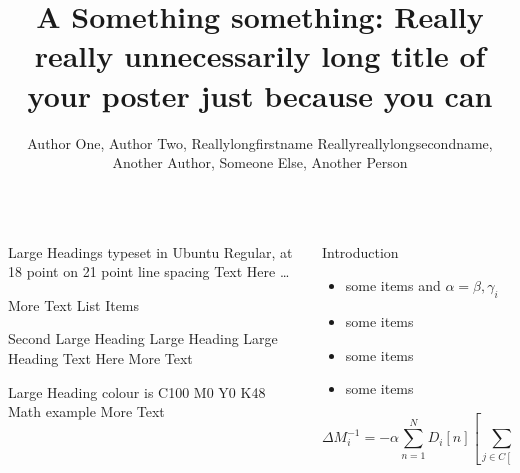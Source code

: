 \documentclass[final,hyperref={pdfpagelabels=false}]{beamer}
\title{A Something something: Really really unnecessarily long title of your poster just because you can}
\author{Author One, Author Two, Reallylongfirstname Reallyreallylongsecondname, \\ Another Author, Someone Else, Another Person}
\begin{document}
\begin{frame}{}
\begin{columns}[T] %
\begin{column}{.43\paperwidth} %

\begin{block}{Large Headings typeset in Ubuntu Regular, at 18 point on 21 point line spacing}
Text Here \dots

More Text \blindtext
{}
List Items \blinditemize
\end{block}

\begin{block}{Second Large Heading Large Heading Large Heading}
Text Here \blinddescription
{}
More Text \blindtext
\end{block}

\begin{block}{Large Heading colour is C100 M0 Y0 K48}
Math example \blindmathtrue
More Text \blindtext
\end{block}


\end{column}
\begin{column}{.43\paperwidth} %


\begin{block}{Introduction}
	\begin{itemize}
		\item some items and $\alpha=\beta,\gamma_{i}$
		\item some items
		\item some items
		\item some items
	\end{itemize}

	$$\Delta M_i^{-1} = - \alpha \sum_{n=1}^N D_i \left[ n \right] \left[ \sum_{j \in C \left[ i \right]}^{} F_{ji} \left[ n-1 \right] + Fext_i \left[ n^{-1} \right] \right]$$
	
\end{block}


\end{column}
\end{columns}
\end{frame}
\end{document}
